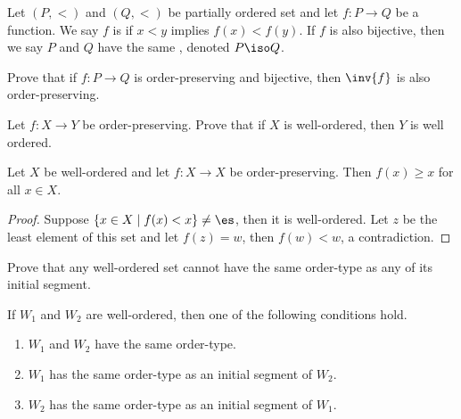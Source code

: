 \documentclass[10pt]{article}
\begin{document}
\begin{definition}
    Let $(P,<)$ and $(Q,<)$ be partially ordered set and let $f:P\to Q$ be a function. We say $f$ is  if $x<y$ implies $f(x)<f(y)$. If $f$ is also bijective, then we say $P$ and $Q$ have the same , denoted $P\iso Q$.
\end{definition}
\begin{problem}
    Prove that if $f:P\to Q$ is order-preserving and bijective, then $\inv{f}$ is also order-preserving.
\end{problem}
\begin{problem}
    Let $f:X\to Y$ be order-preserving. Prove that if $X$ is well-ordered, then $Y$ is well ordered.
\end{problem}
\begin{proposition}
    Let $X$ be well-ordered and let $f:X\to X$ be order-preserving. Then $f(x)\ge x$ for all $x\in X$.
\end{proposition}
\begin{proof}
    Suppose $\{x\in X\mid f(x)<x\}\ne\es$, then it is well-ordered. Let $z$ be the least element of this set and let $f(z)=w$, then $f(w)<w$, a contradiction.
\end{proof}
\begin{problem}
    Prove that any well-ordered set cannot have the same order-type as any of its initial segment.
\end{problem}
\begin{proposition}
    If ${W}_{1}$ and ${W}_{2}$ are well-ordered, then one of the following conditions hold.
    \begin{enumerate}
        \item ${W}_{1}$ and ${W}_{2}$ have the same order-type.
        \item ${W}_{1}$ has the same order-type as an initial segment of ${W}_{2}$.
        \item ${W}_{2}$ has the same order-type as an initial segment of ${W}_{1}$.
    \end{enumerate}
\end{proposition}
\end{document}
